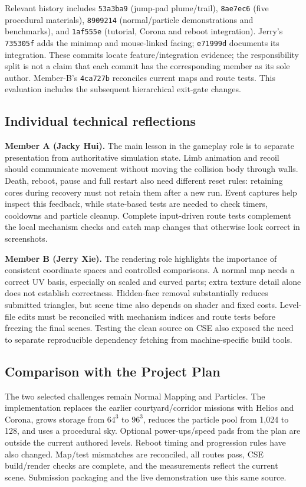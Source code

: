 \documentclass[10pt,a4paper,twocolumn]{article}
\newcommand{\code}[1]{\texttt{#1}}
\begin{document}
Relevant history includes \code{53a3ba9} (jump-pad plume/trail), \code{8ae7ec6} (five procedural materials), \code{8909214} (normal/particle demonstrations and benchmarks), and \code{1af555e} (tutorial, Corona and reboot integration). Jerry's \code{735305f} adds the minimap and mouse-linked facing; \code{e71999d} documents its integration. These commits locate feature/integration evidence; the responsibility split is not a claim that each commit has the corresponding member as its sole author. Member-B's \code{4ca727b} reconciles current maps and route tests. This evaluation includes the subsequent hierarchical exit-gate changes.

\subsection{Individual technical reflections}
\textbf{Member A (Jacky Hui).} The main lesson in the gameplay role is to separate presentation from authoritative simulation state. Limb animation and recoil should communicate movement without moving the collision body through walls. Death, reboot, pause and full restart also need different reset rules: retaining cores during recovery must not retain them after a new run. Event captures help inspect this feedback, while state-based tests are needed to check timers, cooldowns and particle cleanup. Complete input-driven route tests complement the local mechanism checks and catch map changes that otherwise look correct in screenshots.

\textbf{Member B (Jerry Xie).} The rendering role highlights the importance of consistent coordinate spaces and controlled comparisons. A normal map needs a correct UV basis, especially on scaled and curved parts; extra texture detail alone does not establish correctness. Hidden-face removal substantially reduces submitted triangles, but scene time also depends on shader and fixed costs. Level-file edits must be reconciled with mechanism indices and route tests before freezing the final scenes. Testing the clean source on CSE also exposed the need to separate reproducible dependency fetching from machine-specific build tools.

\subsection{Comparison with the Project Plan} The two selected challenges remain Normal Mapping and Particles. The implementation replaces the earlier courtyard/corridor missions with Helios and Corona, grows storage from $64^3$ to $96^3$, reduces the particle pool from 1,024 to 128, and uses a procedural sky. Optional power-ups/speed pads from the plan are outside the current authored levels. Reboot timing and progression rules have also changed. Map/test mismatches are reconciled, all routes pass, CSE build/render checks are complete, and the measurements reflect the current scene. Submission packaging and the live demonstration use this same source.
\end{document}
